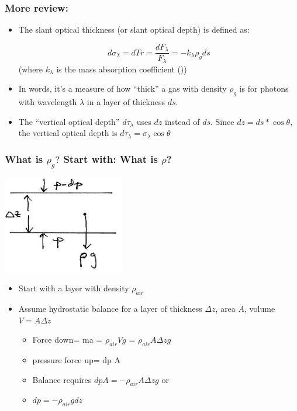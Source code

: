 \documentclass[hyperref={colorlinks=true,linkcolor=blue,urlcolor=blue},numbers]{beamer}
\begin{document}
\begin{frame}
  \frametitle{More review: }

  \begin{itemize}
  \item The slant  optical thickness (or slant optical depth)
is defined as:

\begin{equation*}
  d\sigma_\lambda = dTr = \frac{dF_\lambda }{F_\lambda} = -k_\lambda
  \rho_g ds
\end{equation*}
(where $k_\lambda$ is the mass absorption coefficient ())
\item In words, it's a measure of how ``thick'' a gas with density
$\rho_g$  is for photons with wavelength $\lambda$ in a layer of
thickness $ds$.

\item The ``vertical optical depth'' $d\tau_\lambda$ uses $dz$ instead of $ds$.
Since 
$dz = ds*\cos\theta$, the vertical optical depth is 
$d\tau_\lambda =\sigma_\lambda \cos \theta$

  \end{itemize}

\end{frame}

\begin{frame}
  \frametitle{What is $\rho_g?$   Start with: What is $\rho$?}

\includegraphics[width=0.4\textwidth]{hydrostat}

  \begin{itemize}


  \item Start with a layer with density $\rho_{air}$

  \item Assume hydrostatic balance for a layer of
thickness $\Delta z$, area $A$, volume $V=A \Delta z$


    \begin{itemize}
    \item Force down= ma = $\rho_{air} V g$ = $\rho_{air} A \Delta z g$
    \item pressure force up= dp A
    \item Balance requires $dp A = -\rho_{air} A \Delta z g$ or
    \item $dp = -\rho_{air} g dz$
    \end{itemize}
  \end{itemize}

\end{frame}
\end{document}

